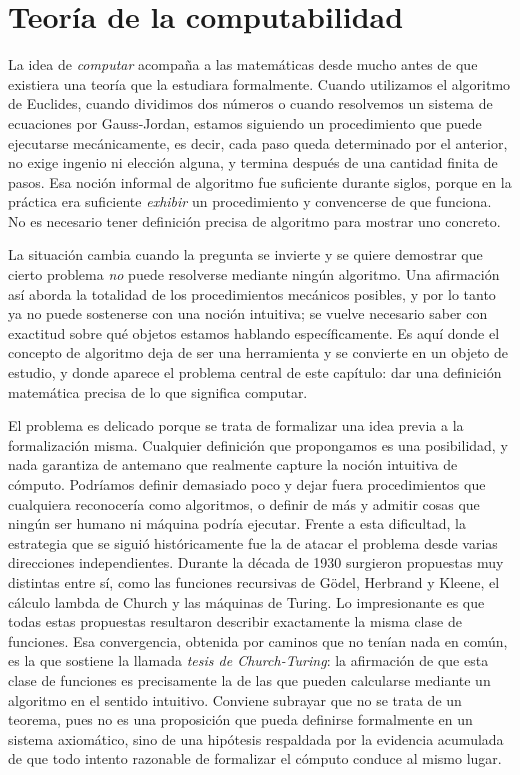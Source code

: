 \chapter{Teoría de la computabilidad}

La idea de \emph{computar} acompaña a las matemáticas desde mucho antes de que existiera una teoría que la estudiara formalmente. Cuando utilizamos el algoritmo de Euclides, cuando dividimos dos números o cuando resolvemos un sistema de ecuaciones por Gauss-Jordan, estamos siguiendo un procedimiento que puede ejecutarse mecánicamente, es decir, cada paso queda determinado por el anterior, no exige ingenio ni elección alguna, y termina después de una cantidad finita de pasos. Esa noción informal de algoritmo fue suficiente durante siglos, porque en la práctica era suficiente \emph{exhibir} un procedimiento y convencerse de que funciona. No es necesario tener definición precisa de algoritmo para mostrar uno concreto.

La situación cambia cuando la pregunta se invierte y se quiere demostrar que cierto problema \emph{no} puede resolverse mediante ningún algoritmo. Una afirmación así aborda la totalidad de los procedimientos mecánicos posibles, y por lo tanto ya no puede sostenerse con una noción intuitiva; se vuelve necesario saber con exactitud sobre qué objetos estamos hablando específicamente. Es aquí donde el concepto de algoritmo deja de ser una herramienta y se convierte en un objeto de estudio, y donde aparece el problema central de este capítulo: dar una definición matemática precisa de lo que significa computar.

El problema es delicado porque se trata de formalizar una idea previa a la formalización misma. Cualquier definición que propongamos es una posibilidad, y nada garantiza de antemano que realmente capture la noción intuitiva de cómputo. Podríamos definir demasiado poco y dejar fuera procedimientos que cualquiera reconocería como algoritmos, o definir de más y admitir cosas que ningún ser humano ni máquina podría ejecutar. Frente a esta dificultad, la estrategia que se siguió históricamente fue la de atacar el problema desde varias direcciones independientes. Durante la década de 1930 surgieron propuestas muy distintas entre sí, como las funciones recursivas de Gödel, Herbrand y Kleene, el cálculo lambda de Church y las máquinas de Turing. Lo impresionante es que todas estas propuestas resultaron describir exactamente la misma clase de funciones. Esa convergencia, obtenida por caminos que no tenían nada en común, es la que sostiene la llamada \emph{tesis de Church-Turing}: la afirmación de que esta clase de funciones es precisamente la de las que pueden calcularse mediante un algoritmo en el sentido intuitivo. Conviene subrayar que no se trata de un teorema, pues no es una proposición que pueda definirse formalmente en un sistema axiomático, sino de una hipótesis respaldada por la evidencia acumulada de que todo intento razonable de formalizar el cómputo conduce al mismo lugar.

